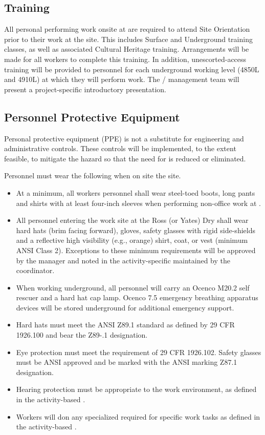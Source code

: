 \subsection{ Training}


All personal performing work onsite at  are required to
attend   Site Orientation prior to their work
at the site.  This includes  Surface and Underground
training classes, as well as associated Cultural Heritage
training. Arrangements will be made for all workers to complete this
training. In addition, unescorted-access training will be provided to
personnel for each underground working level (4850L and 4910L) at
which they will perform work.  The /
 management team will present a project-specific
introductory  presentation.

\subsection{Personnel Protective Equipment}

Personal protective equipment (PPE) is not a substitute for
engineering and administrative controls. These controls will be
implemented, to the extent feasible, to mitigate the hazard so that
the need for  is reduced or eliminated.

Personnel must wear the following  when on site the  site.
\begin{itemize}
\item At a minimum, all workers personnel shall wear
  steel-toed boots, long pants and shirts with at least four-inch sleeves when
  performing non-office work at . 
  \item All personnel entering the work site at the Ross (or Yates) Dry
    shall wear hard hats (brim facing forward), gloves,
    safety glasses with rigid side-shields and a reflective high
    visibility (e.g., orange) shirt, coat, or vest (minimum ANSI Class 2).
    Exceptions to these minimum requirements will be approved by the
      manager and noted in the
    activity-specific  maintained by the   coordinator.
  \item When working underground, all personnel will carry an Ocenco M20.2 self rescuer
    and a hard hat cap lamp.  Ocenco 7.5 emergency breathing apparatus devices
    will be stored underground for additional emergency support.
  \item Hard hats must meet the ANSI Z89.1 standard as defined by 29
    CFR 1926.100 and bear the Z89-.1 designation. 
   \item Eye protection must meet the requirement of 29 CFR
      1926.102. Safety glasses must be ANSI approved and be marked
      with the ANSI marking Z87.1 designation.
    \item Hearing protection must be appropriate to the work environment, as
      defined in the activity-based .
    \item Workers will don any specialized  required for specific work tasks as
      defined in the activity-based . 
\end{itemize}

